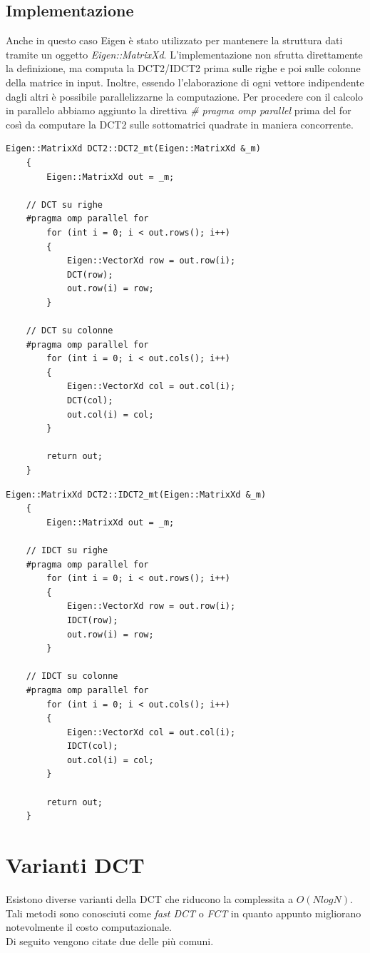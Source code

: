 \documentclass[a4paper,12pt]{report}
\begin{document}
\subsection*{Implementazione}
Anche in questo caso Eigen è stato utilizzato per mantenere la struttura dati tramite un oggetto \textit{Eigen::MatrixXd}. L'implementazione non sfrutta direttamente la definizione, ma computa la DCT2/IDCT2 prima sulle righe e poi sulle colonne della matrice in input. Inoltre, essendo l'elaborazione di ogni vettore indipendente dagli altri è possibile parallelizzarne la computazione. Per procedere con il calcolo in parallelo abbiamo aggiunto la direttiva \textit{\# pragma omp parallel} prima del for così da computare la DCT2 sulle sottomatrici quadrate in maniera concorrente. \\
\begin{lstlisting}[caption={Funzione di calcolo DCT2},captionpos=b]
	Eigen::MatrixXd DCT2::DCT2_mt(Eigen::MatrixXd &_m)
	{
		Eigen::MatrixXd out = _m;
	
	// DCT su righe
	#pragma omp parallel for
		for (int i = 0; i < out.rows(); i++)
		{
			Eigen::VectorXd row = out.row(i);
			DCT(row);
			out.row(i) = row;
		}
	
	// DCT su colonne
	#pragma omp parallel for
		for (int i = 0; i < out.cols(); i++)
		{
			Eigen::VectorXd col = out.col(i);
			DCT(col);
			out.col(i) = col;
		}
	
		return out;
	}
\end{lstlisting}
\newpage
\begin{lstlisting}[caption={Funzione di calcolo IDCT2},captionpos=b]
	Eigen::MatrixXd DCT2::IDCT2_mt(Eigen::MatrixXd &_m)
	{
		Eigen::MatrixXd out = _m;
	
	// IDCT su righe
	#pragma omp parallel for
		for (int i = 0; i < out.rows(); i++)
		{
			Eigen::VectorXd row = out.row(i);
			IDCT(row);
			out.row(i) = row;
		}
	
	// IDCT su colonne
	#pragma omp parallel for
		for (int i = 0; i < out.cols(); i++)
		{
			Eigen::VectorXd col = out.col(i);
			IDCT(col);
			out.col(i) = col;
		}
	
		return out;
	}
\end{lstlisting}

\section{Varianti DCT}
Esistono diverse varianti della DCT che riducono la complessita a \(O(NlogN)\). Tali metodi sono conosciuti come \textit{fast DCT} o \textit{FCT} in quanto appunto migliorano notevolmente il costo computazionale.\\Di seguito vengono citate due delle più comuni.
\end{document}
